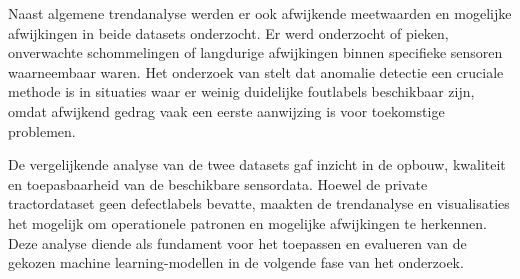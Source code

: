 Naast algemene trendanalyse werden er ook afwijkende meetwaarden en mogelijke afwijkingen in beide datasets onderzocht. Er werd onderzocht of pieken, onverwachte schommelingen of langdurige afwijkingen binnen specifieke sensoren waarneembaar waren. Het onderzoek van \textcite{Giannoulidis2024} stelt dat anomalie detectie een cruciale methode is in situaties waar er weinig duidelijke foutlabels beschikbaar zijn, omdat afwijkend gedrag vaak een eerste aanwijzing is voor toekomstige problemen.

De vergelijkende analyse van de twee datasets gaf inzicht in de opbouw, kwaliteit en toepasbaarheid van de beschikbare sensordata. Hoewel de private tractordataset geen defectlabels bevatte, maakten de trendanalyse en visualisaties het mogelijk om operationele patronen en mogelijke afwijkingen te herkennen. Deze analyse diende als fundament voor het toepassen en evalueren van de gekozen machine learning-modellen in de volgende fase van het onderzoek.




